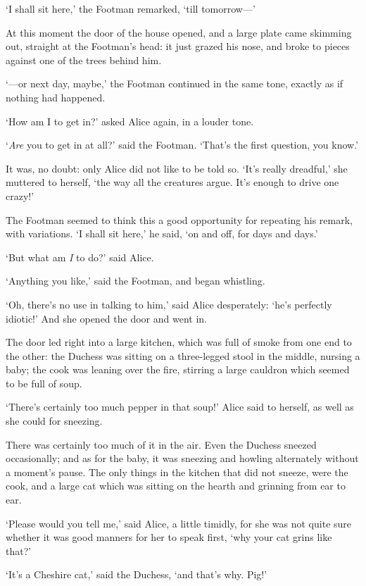 \documentclass[12pt,openany]{memoir}
\begin{document}
`I shall sit here,' the Footman remarked, `till tomorrow---'

At this moment the door of the house opened, and a large plate came skimming out, straight at the Footman's head: it just grazed his nose, and broke to pieces against one of the trees behind him.

`---or next day, maybe,' the Footman continued in the same tone, exactly as if nothing had happened.

`How am I to get in?' asked Alice again, in a louder tone.

`\textit{Are} you to get in at all?' said the Footman. `That's the first question, you know.'

It was, no doubt: only Alice did not like to be told so. `It's really dreadful,' she muttered to herself, `the way all the creatures argue. It's enough to drive one crazy!'

The Footman seemed to think this a good opportunity for repeating his remark, with variations. `I shall sit here,' he said, `on and off, for days and days.'

`But what am \textit{I} to do?' said Alice.

`Anything you like,' said the Footman, and began whistling.

`Oh, there's no use in talking to him,' said Alice desperately: `he's perfectly idiotic!' And she opened the door and went in.

The door led right into a large kitchen, which was full of smoke from one end to the other: the Duchess was sitting on a three-legged stool in the middle, nursing a baby; the cook was leaning over the fire, stirring a large cauldron which seemed to be full of soup.

`There's certainly too much pepper in that soup!' Alice said to herself, as well as she could for sneezing.

There was certainly too much of it in the air. Even the Duchess sneezed occasionally; and as for the baby, it was sneezing and howling alternately without a moment's pause. The only things in the kitchen that did not sneeze, were the cook, and a large cat which was sitting on the hearth and grinning from ear to ear.

`Please would you tell me,' said Alice, a little timidly, for she was not quite sure whether it was good manners for her to speak first, `why your cat grins like that?'

`It's a Cheshire cat,' said the Duchess, `and that's why. Pig!'
\end{document}

